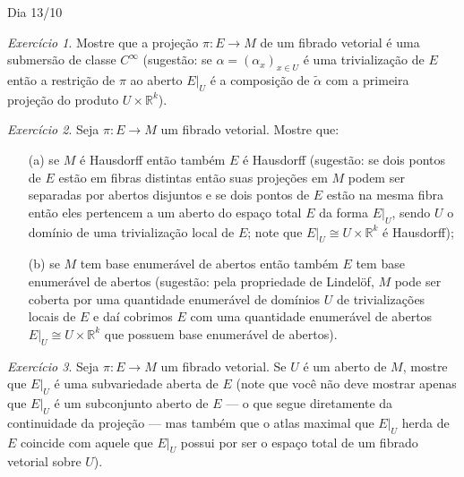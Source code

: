\documentclass[oneside,11pt]{amsart}
\newcommand{\R}{\mathds R}
\theoremstyle{remark}\newtheorem{exercise}{Exercício}[section]
\theoremstyle{plain}\newtheorem{teo}{Teorema}[section]
\theoremstyle{plain}\newtheorem{lem}[teo]{Lema}
\theoremstyle{plain}\newtheorem{prop}[teo]{Proposição}
\theoremstyle{definition}\newtheorem{defin}[teo]{Definição}
\theoremstyle{remark}\newtheorem{rem}[teo]{Observação}
\theoremstyle{definition}\newtheorem{example}[teo]{Exemplo}
\numberwithin{equation}{section}
\begin{document}
\begin{section}{Dia 13/10}
\begin{exercise}
Mostre que a projeção $\pi:E\to M$ de um fibrado vetorial é uma submersão de classe $C^\infty$ (sugestão: se $\alpha=(\alpha_x)_{x\in U}$ é uma trivialização
de $E$ então a restrição de $\pi$ ao aberto $E\vert_U$ é a composição de $\tilde\alpha$ com a primeira projeção do produto $U\times\R^k$).
\end{exercise}

\begin{exercise}
Seja $\pi:E\to M$ um fibrado vetorial. Mostre que:
\begin{itemize}
\item[(a)] se $M$ é Hausdorff então também $E$ é Hausdorff (sugestão: se dois pontos de $E$ estão em fibras distintas então suas projeções em $M$ podem ser separadas por abertos
disjuntos e se dois pontos de $E$ estão na mesma fibra então eles pertencem a um aberto do espaço total $E$ da forma $E\vert_U$, sendo $U$ o
domínio de uma trivialização local de $E$; note que $E\vert_U\cong U\times\R^k$ é Hausdorff);
\item[(b)] se $M$ tem base enumerável de abertos então também $E$ tem base enumerável de abertos (sugestão: pela propriedade de Lindelöf, $M$ pode ser
coberta por uma quantidade enumerável de domínios $U$ de trivializações locais de $E$ e daí cobrimos $E$ com uma quantidade enumerável de abertos $E\vert_U\cong U\times\R^k$
que possuem base enumerável de abertos).
\end{itemize}
\end{exercise}

\begin{exercise}
Seja $\pi:E\to M$ um fibrado vetorial. Se $U$ é um aberto de $M$, mostre que $E\vert_U$ é uma subvariedade aberta de $E$ (note que você não deve mostrar
apenas que $E\vert_U$ é um subconjunto aberto de $E$ --- o que segue diretamente da continuidade da projeção --- mas também que o atlas maximal
que $E\vert_U$ herda de $E$ coincide com aquele que $E\vert_U$ possui por ser o espaço total de um fibrado vetorial sobre $U$).
\end{exercise}


\end{section}
\end{document}
